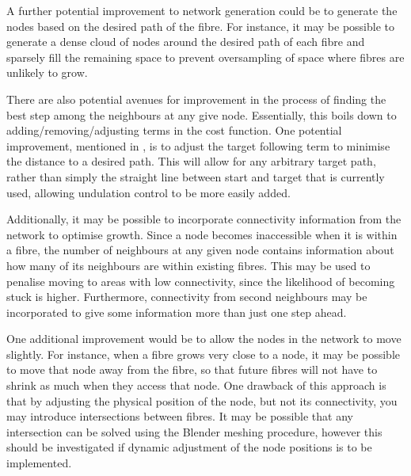 A further potential improvement to network generation could be to generate the nodes based on the desired path of the fibre.
For instance, it may be possible to generate a dense cloud of nodes around the desired path of each fibre and sparsely fill the remaining space to prevent oversampling of space where fibres are unlikely to grow.

There are also potential avenues for improvement in the process of finding the best step among the neighbours at any give node.
Essentially, this boils down to adding/removing/adjusting terms in the cost function.
One potential improvement, mentioned in , is to adjust the target following term to minimise the distance to a desired path.
This will allow for any arbitrary target path, rather than simply the straight line between start and target that is currently used, allowing undulation control to be more easily added.

Additionally, it may be possible to incorporate connectivity information from the network to optimise growth.
Since a node becomes inaccessible when it is within a fibre, the number of neighbours at any given node contains information about how many of its neighbours are within existing fibres.
This may be used to penalise moving to areas with low connectivity, since the likelihood of becoming stuck is higher.
Furthermore, connectivity from second neighbours may be incorporated to give some information more than just one step ahead. 

One additional improvement would be to allow the nodes in the network to move slightly.
For instance, when a fibre grows very close to a node, it may be possible to move that node away from the fibre, so that future fibres will not have to shrink as much when they access that node.
One drawback of this approach is that by adjusting the physical position of the node, but not its connectivity, you may introduce intersections between fibres.
It may be possible that any intersection can be solved using the Blender meshing procedure, however this should be investigated if dynamic adjustment of the node positions is to be implemented. 

